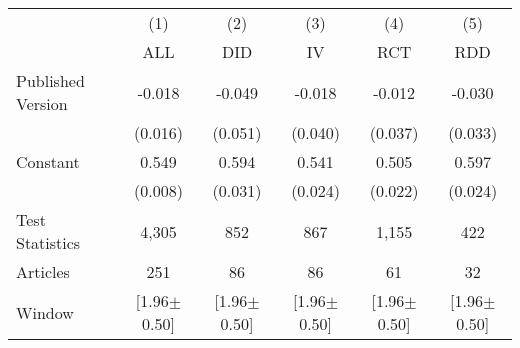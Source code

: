 \begin{tabular}{l*{5}{c}}
\hline\hline
                &\multicolumn{1}{c}{(1)}&\multicolumn{1}{c}{(2)}&\multicolumn{1}{c}{(3)}&\multicolumn{1}{c}{(4)}&\multicolumn{1}{c}{(5)}\\
                &\multicolumn{1}{c}{ALL}&\multicolumn{1}{c}{DID}&\multicolumn{1}{c}{IV}&\multicolumn{1}{c}{RCT}&\multicolumn{1}{c}{RDD}\\
\hline
Published Version&   -0.018&   -0.049&   -0.018&   -0.012&   -0.030\\
                &  (0.016)&  (0.051)&  (0.040)&  (0.037)&  (0.033)\\
Constant        &    0.549&    0.594&    0.541&    0.505&    0.597\\
                &  (0.008)&  (0.031)&  (0.024)&  (0.022)&  (0.024)\\
\hline
Test Statistics &    4,305&      852&      867&    1,155&      422\\
Articles        &      251&       86&       86&       61&       32\\
Window          &[1.96$\pm$0.50]&[1.96$\pm$0.50]&[1.96$\pm$0.50]&[1.96$\pm$0.50]&[1.96$\pm$0.50]\\
\hline\hline
\end{tabular}
